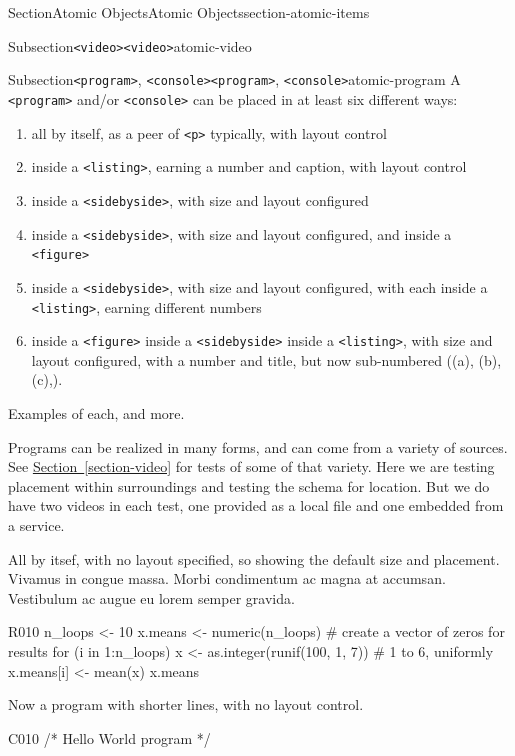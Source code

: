 \documentclass[twoside,10pt,]{article}
\newcommand{\xreffont}{\relax}
\newcommand{\mono}[1]{\texttt{#1}}
\numberwithin{equation}{section}
\begin{document}
\begin{sectionptx}{Section}{Atomic Objects}{}{Atomic Objects}{}{}{section-atomic-items}
\begin{subsectionptx}{Subsection}{\mono{<video>}}{}{\mono{<video>}}{}{}{atomic-video}
\end{subsectionptx}
%
%
\typeout{************************************************}
\typeout{Subsection 30.3 \mono{<program>}, \mono{<console>}}
\typeout{************************************************}
%
\begin{subsectionptx}{Subsection}{\mono{<program>}, \mono{<console>}}{}{\mono{<program>}, \mono{<console>}}{}{}{atomic-program}
A \mono{<program>} and\slash{}or \mono{<console>} can be placed in at least six  different ways:%
\begin{enumerate}
\item{}all by itself, as a peer of \mono{<p>} typically, with layout control%
\item{}inside a \mono{<listing>}, earning a number and caption, with layout control%
\item{}inside a \mono{<sidebyside>}, with size and layout configured%
\item{}inside a \mono{<sidebyside>}, with size and layout configured, and inside a \mono{<figure>}%
\item{}inside a \mono{<sidebyside>}, with size and layout configured, with each inside a \mono{<listing>}, earning different numbers%
\item{}inside a \mono{<figure>} inside a \mono{<sidebyside>} inside a \mono{<listing>}, with size and layout configured, with a number and title, but now sub-numbered ((a), (b), (c),\textellipsis{}).%
\end{enumerate}
Examples of each, and more.%
\par
Programs can be realized in many forms, and can come from a variety of sources.  See \hyperref[section-video]{Section~{\xreffont\ref{section-video}}} for tests of some of that variety.  Here we are testing placement within surroundings and testing the schema for location.  But we do have two videos in each test, one provided as a local file and one embedded from a service.%
\par
All by itsef, with no layout specified, so showing the default size and placement.  Vivamus in congue massa. Morbi condimentum ac magna at accumsan. Vestibulum ac augue eu lorem semper gravida.%
\begin{program}{R}{0}{1}{0}
n_loops <- 10
x.means <- numeric(n_loops)  # create a vector of zeros for results
for (i in 1:n_loops){
    x <- as.integer(runif(100, 1, 7))  # 1 to 6, uniformly
    x.means[i] <- mean(x)
}
x.means
\end{program}
Now a program with shorter lines, with no layout control.%
\begin{program}{C}{0}{1}{0}
/* Hello World program */


\end{program}
\end{subsectionptx}
\end{sectionptx}
\end{document}
